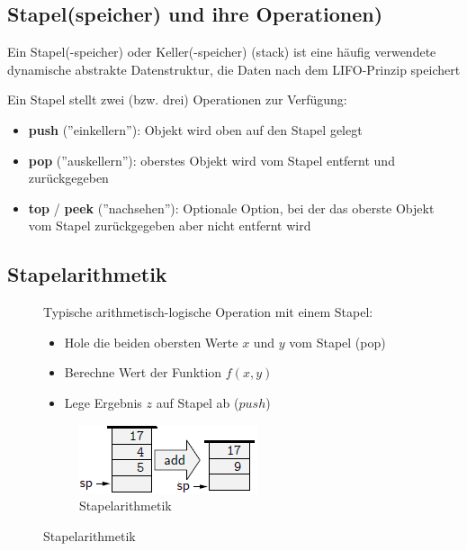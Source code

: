 \documentclass[12pt]{report}
\begin{document}
\subsection{Stapel(speicher) und ihre Operationen)}
\begin{defbox}
  Ein Stapel(-speicher) oder Keller(-speicher) (stack) ist eine häufig verwendete 
  dynamische abstrakte Datenstruktur, die Daten nach dem LIFO-Prinzip speichert
\end{defbox}

Ein Stapel stellt zwei (bzw. drei) Operationen zur Verfügung:
\begin{itemize}
  \item \textbf{push} (''einkellern''): Objekt wird oben auf den Stapel gelegt
  \item \textbf{pop} (''auskellern''): oberstes Objekt wird vom Stapel entfernt und zurückgegeben
  \item \textbf{top} / \textbf{peek} (''nachsehen''): Optionale Option, bei der das oberste Objekt vom Stapel zurückgegeben aber nicht entfernt wird
\end{itemize}

\subsection{Stapelarithmetik}
\begin{figure}[H]
  \begin{minipage}[t]{0.6\textwidth}
    Typische arithmetisch-logische Operation mit einem Stapel:
    \begin{itemize}
      \item Hole die beiden obersten Werte $x$ und $y$ vom Stapel (pop)
      \item Berechne Wert der Funktion $f(x,y)$
      \item Lege Ergebnis $z$ auf Stapel ab ($push$)
    \end{itemize}
    
  \end{minipage}
  \hfill
  \begin{minipage}[t]{0.35\textwidth}
    \begin{figure}[H]
      \caption{Stapelarithmetik}
      \label{fig:stapelarithmetik}
      \centering
      \includegraphics{stapelarithmetik}
    \end{figure}
  \end{minipage}
\end{figure}
\end{document}
